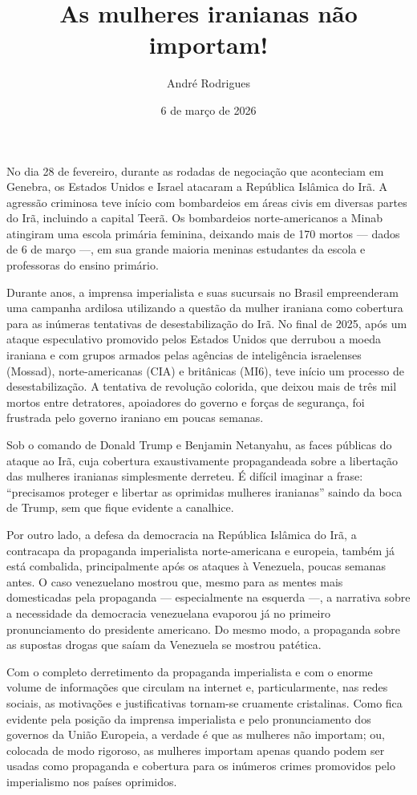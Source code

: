 \documentclass[12pt,twocolumn]{article}
\author{André Rodrigues}
\date{6 de março de 2026}
\title{As mulheres iranianas não importam!}
\begin{document}
No dia 28 de fevereiro, durante as rodadas de negociação que aconteciam em Genebra, os Estados Unidos e Israel atacaram a República Islâmica do Irã. A agressão criminosa teve início com bombardeios em áreas civis em diversas partes do Irã, incluindo a capital Teerã. Os bombardeios norte-americanos a Minab atingiram uma escola primária feminina, deixando mais de 170 mortos — dados de 6 de março —, em sua grande maioria meninas estudantes da escola e professoras do ensino primário.

Durante anos, a imprensa imperialista e suas sucursais no Brasil empreenderam uma campanha ardilosa utilizando a questão da mulher iraniana como cobertura para as inúmeras tentativas de desestabilização do Irã. No final de 2025, após um ataque especulativo promovido pelos Estados Unidos que derrubou a moeda iraniana e com grupos armados pelas agências de inteligência israelenses (Mossad), norte-americanas (CIA) e britânicas (MI6), teve início um processo de desestabilização. A tentativa de revolução colorida, que deixou mais de três mil mortos entre detratores, apoiadores do governo e forças de segurança, foi frustrada pelo governo iraniano em poucas semanas.

Sob o comando de Donald Trump e Benjamin Netanyahu, as faces públicas do ataque ao Irã, cuja cobertura exaustivamente propagandeada sobre a libertação das mulheres iranianas simplesmente derreteu. É difícil imaginar a frase: ``precisamos proteger e libertar as oprimidas mulheres iranianas'' saindo da boca de Trump, sem que fique evidente a canalhice.

Por outro lado, a defesa da democracia na República Islâmica do Irã, a contracapa da propaganda imperialista norte-americana e europeia, também já está combalida, principalmente após os ataques à Venezuela, poucas semanas antes. O caso venezuelano mostrou que, mesmo para as mentes mais domesticadas pela propaganda — especialmente na esquerda —, a narrativa sobre a necessidade da democracia venezuelana evaporou já no primeiro pronunciamento do presidente americano. Do mesmo modo, a propaganda sobre as supostas drogas que saíam da Venezuela se mostrou patética.

Com o completo derretimento da propaganda imperialista e com o enorme volume de informações que circulam na internet e, particularmente, nas redes sociais, as motivações e justificativas tornam-se cruamente cristalinas. Como fica evidente pela posição da imprensa imperialista e pelo pronunciamento dos governos da União Europeia, a verdade é que as mulheres não importam; ou, colocada de modo rigoroso, as mulheres importam apenas quando podem ser usadas como propaganda e cobertura para os inúmeros crimes promovidos pelo imperialismo nos países oprimidos.
\end{document}
